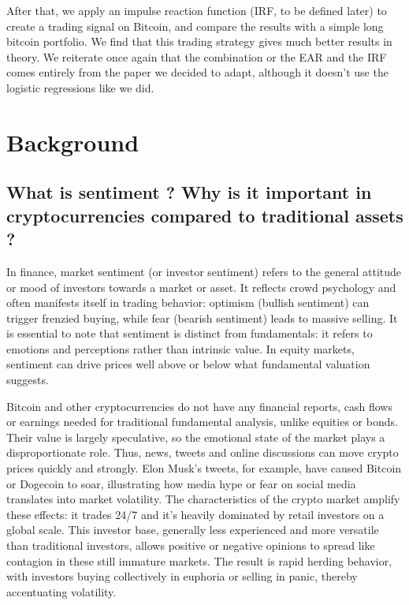 \documentclass[
  a4paper]{article}
\begin{document}
After that, we apply an impulse reaction function (IRF, to be defined
later) to create a trading signal on Bitcoin, and compare the results
with a simple long bitcoin portfolio. We find that this trading strategy
gives much better results in theory. We reiterate once again that the
combination or the EAR and the IRF comes entirely from the paper we
decided to adapt, although it doesn't use the logistic regressions like
we did.

\hypertarget{background}{%
\section{Background}\label{background}}

\hypertarget{what-is-sentiment-why-is-it-important-in-cryptocurrencies-compared-to-traditional-assets}{%
\subsection{What is sentiment ? Why is it important in cryptocurrencies
compared to traditional assets
?}\label{what-is-sentiment-why-is-it-important-in-cryptocurrencies-compared-to-traditional-assets}}

In finance, market sentiment (or investor sentiment) refers to the
general attitude or mood of investors towards a market or asset. It
reflects crowd psychology and often manifests itself in trading
behavior: optimism (bullish sentiment) can trigger frenzied buying,
while fear (bearish sentiment) leads to massive selling. It is essential
to note that sentiment is distinct from fundamentals: it refers to
emotions and perceptions rather than intrinsic value. In equity markets,
sentiment can drive prices well above or below what fundamental
valuation suggests.

Bitcoin and other cryptocurrencies do not have any financial reports,
cash flows or earnings needed for traditional fundamental analysis,
unlike equities or bonds. Their value is largely speculative, so the
emotional state of the market plays a disproportionate role. Thus, news,
tweets and online discussions can move crypto prices quickly and
strongly. Elon Musk's tweets, for example, have caused Bitcoin or
Dogecoin to soar, illustrating how media hype or fear on social media
translates into market volatility. The characteristics of the crypto
market amplify these effects: it trades 24/7 and it's heavily dominated
by retail investors on a global scale. This investor base, generally
less experienced and more versatile than traditional investors, allows
positive or negative opinions to spread like contagion in these still
immature markets. The result is rapid herding behavior, with investors
buying collectively in euphoria or selling in panic, thereby
accentuating volatility.
\end{document}
